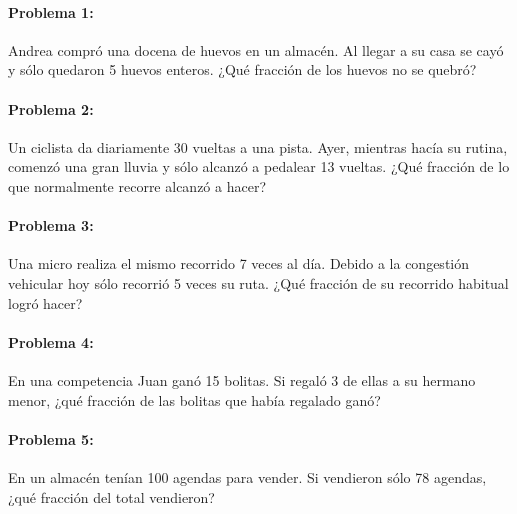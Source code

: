 \documentclass[10pt,twoside]{article}
\begin{document}
\paragraph*{Problema 1:}
Andrea compró una docena de huevos en un almacén. Al llegar a su casa se cayó y sólo quedaron 5 huevos enteros. ¿Qué fracción de los huevos no se quebró?
\paragraph*{Problema 2:}
Un ciclista da diariamente 30 vueltas a una pista. Ayer, mientras hacía su rutina, comenzó una gran lluvia y sólo alcanzó a pedalear 13 vueltas. ¿Qué fracción de lo que normalmente recorre alcanzó a hacer?
\paragraph*{Problema 3:}
Una micro realiza el mismo recorrido 7 veces al día. Debido a la congestión vehicular hoy sólo recorrió 5 veces su ruta. ¿Qué fracción de su recorrido habitual logró hacer?
\paragraph*{Problema 4:}
En una competencia Juan ganó 15 bolitas. Si regaló 3 de ellas a su hermano menor, ¿qué fracción de las bolitas que había regalado ganó?
\paragraph*{Problema 5:}
En un almacén tenían 100 agendas para vender. Si vendieron sólo 78 agendas, ¿qué fracción del total vendieron?
\end{document}
